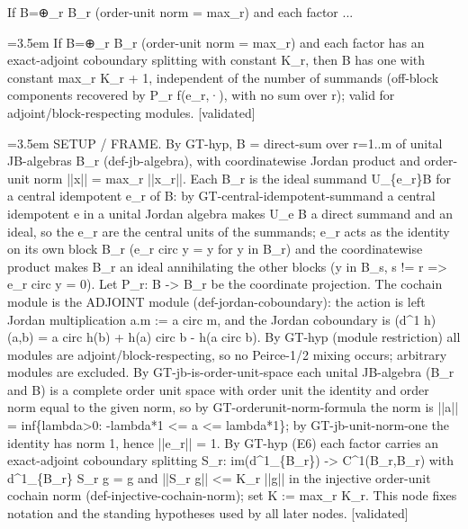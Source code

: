 \documentclass{article}
\newcommand{\step}[1]{\par\noindent\hangindent=3.5em\hangafter=1%
  \makebox[3.5em][l]{\textbf{#1.}}}
\newcommand{\steptag}[1]{\hfill{\small\textsf{[#1]}}}
\begin{document}
\begin{proofbox}{If B=⊕\_r B\_r (order-unit norm = max\_r) and each factor ...}
\step{1} If B=⊕\_r B\_r (order-unit norm = max\_r) and each factor has an exact-adjoint coboundary splitting with constant K\_r, then B has one with constant max\_r K\_r + 1, independent of the number of summands (off-block components recovered by P\_r f(e\_r,·), with no sum over r); valid for adjoint/block-respecting modules. \steptag{validated} \\[6pt]
\step{1.1} SETUP / FRAME. By GT-hyp, B = direct-sum over r=1..m of unital JB-algebras B\_r (def-jb-algebra), with coordinatewise Jordan product and order-unit norm ||x|| = max\_r ||x\_r||. Each B\_r is the ideal summand U\_\{e\_r\}B for a central idempotent e\_r of B: by GT-central-idempotent-summand a central idempotent e in a unital Jordan algebra makes U\_e B a direct summand and an ideal, so the e\_r are the central units of the summands; e\_r acts as the identity on its own block B\_r (e\_r circ y = y for y in B\_r) and the coordinatewise product makes B\_r an ideal annihilating the other blocks (y in B\_s, s != r => e\_r circ y = 0). Let P\_r: B -> B\_r be the coordinate projection. The cochain module is the ADJOINT module (def-jordan-coboundary): the action is left Jordan multiplication a.m := a circ m, and the Jordan coboundary is (d\textasciicircum{}1 h)(a,b) = a circ h(b) + h(a) circ b - h(a circ b). By GT-hyp (module restriction) all modules are adjoint/block-respecting, so no Peirce-1/2 mixing occurs; arbitrary modules are excluded. By GT-jb-is-order-unit-space each unital JB-algebra (B\_r and B) is a complete order unit space with order unit the identity and order norm equal to the given norm, so by GT-orderunit-norm-formula the norm is ||a|| = inf\{lambda>0: -lambda*1 <= a <= lambda*1\}; by GT-jb-unit-norm-one the identity has norm 1, hence ||e\_r|| = 1. By GT-hyp (E6) each factor carries an exact-adjoint coboundary splitting S\_r: im(d\textasciicircum{}1\_\{B\_r\}) -> C\textasciicircum{}1(B\_r,B\_r) with d\textasciicircum{}1\_\{B\_r\} S\_r g = g and ||S\_r g|| <= K\_r ||g|| in the injective order-unit cochain norm (def-injective-cochain-norm); set K := max\_r K\_r. This node fixes notation and the standing hypotheses used by all later nodes. \steptag{validated} \\[4pt]

\end{proofbox}
\end{document}
